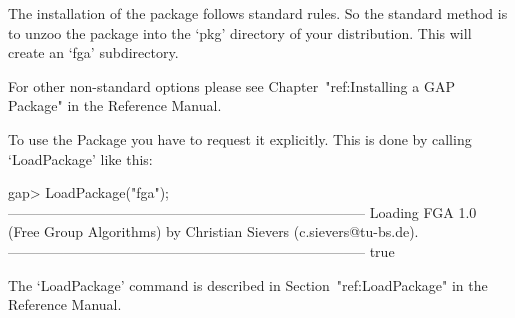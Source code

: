 

\null

The installation of the {\FGA} package follows standard {\GAP} rules.
So the standard method is to unzoo the package into the `pkg'
directory  of your {\GAP} distribution.  This will create an `fga'
subdirectory. 

For other non-standard options please see Chapter~"ref:Installing a
GAP Package" in the {\GAP} Reference Manual.


\null

To use the {\FGA} Package you have to request it explicitly. This  is
done by calling `LoadPackage' like this:

\beginexample
gap> LoadPackage("fga");
-----------------------------------------------------------------------------
Loading  FGA 1.0 (Free Group Algorithms)
by Christian Sievers (c.sievers@tu-bs.de).
-----------------------------------------------------------------------------
true
\endexample

The `LoadPackage' command is described in Section~"ref:LoadPackage"
in the {\GAP} Reference Manual.

